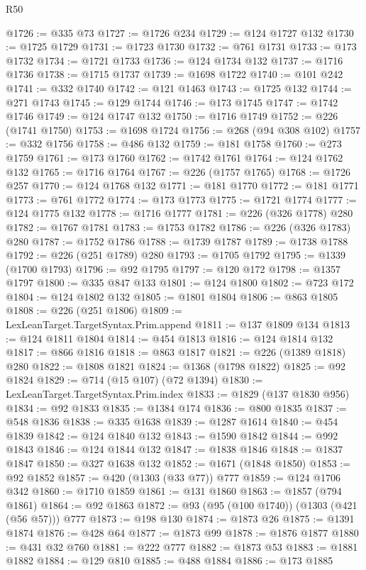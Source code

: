 \begin{lexlean}{R50}
\begin{coremodule}
@1726 := @335 @73
@1727 := @1726 @234
@1729 := @124 @1727 @132
@1730 := @1725 @1729
@1731 := @1723 @1730
@1732 := @761 @1731
@1733 := @173 @1732
@1734 := @1721 @1733
@1736 := @124 @1734 @132
@1737 := @1716 @1736
@1738 := @1715 @1737
@1739 := @1698 @1722
@1740 := @101 @242
@1741 := @332 @1740
@1742 := @121 @1463
@1743 := @1725 @132
@1744 := @271 @1743
@1745 := @129 @1744
@1746 := @173 @1745
@1747 := @1742 @1746
@1749 := @124 @1747 @132
@1750 := @1716 @1749
@1752 := @226 (@1741 @1750)
@1753 := @1698 @1724
@1756 := @268 (@94 @308 @102)
@1757 := @332 @1756
@1758 := @486 @132
@1759 := @181 @1758
@1760 := @273 @1759
@1761 := @173 @1760
@1762 := @1742 @1761
@1764 := @124 @1762 @132
@1765 := @1716 @1764
@1767 := @226 (@1757 @1765)
@1768 := @1726 @257
@1770 := @124 @1768 @132
@1771 := @181 @1770
@1772 := @181 @1771
@1773 := @761 @1772
@1774 := @173 @1773
@1775 := @1721 @1774
@1777 := @124 @1775 @132
@1778 := @1716 @1777
@1781 := @226 (@326 @1778) @280
@1782 := @1767 @1781
@1783 := @1753 @1782
@1786 := @226 (@326 @1783) @280
@1787 := @1752 @1786
@1788 := @1739 @1787
@1789 := @1738 @1788
@1792 := @226 (@251 @1789) @280
@1793 := @1705 @1792
@1795 := @1339 (@1700 @1793)
@1796 := @92 @1795
@1797 := @120 @172
@1798 := @1357 @1797
@1800 := @335 @847 @133
@1801 := @124 @1800
@1802 := @723 @172
@1804 := @124 @1802 @132
@1805 := @1801 @1804
@1806 := @863 @1805
@1808 := @226 (@251 @1806)
@1809 := LexLeanTarget.TargetSyntax.Prim.append
@1811 := @137 @1809 @134
@1813 := @124 @1811 @1804
@1814 := @454 @1813
@1816 := @124 @1814 @132
@1817 := @866 @1816
@1818 := @863 @1817
@1821 := @226 (@1389 @1818) @280
@1822 := @1808 @1821
@1824 := @1368 (@1798 @1822)
@1825 := @92 @1824
@1829 := @714 (@15 @107) (@72 @1394)
@1830 := LexLeanTarget.TargetSyntax.Prim.index
@1833 := @1829 (@137 @1830 @956)
@1834 := @92 @1833
@1835 := @1384 @174
@1836 := @800 @1835
@1837 := @548 @1836
@1838 := @335 @1638
@1839 := @1287 @1614
@1840 := @454 @1839
@1842 := @124 @1840 @132
@1843 := @1590 @1842
@1844 := @992 @1843
@1846 := @124 @1844 @132
@1847 := @1838 @1846
@1848 := @1837 @1847
@1850 := @327 @1638 @132
@1852 := @1671 (@1848 @1850)
@1853 := @92 @1852
@1857 := @420 (@1303 (@33 @77)) @777
@1859 := @124 @1706 @342
@1860 := @1710 @1859
@1861 := @131 @1860
@1863 := @1857 (@794 @1861)
@1864 := @92 @1863
@1872 := @93 (@95 (@100 @1740)) (@1303 (@421 (@56 @57))) @777
@1873 := @198 @130
@1874 := @1873 @26
@1875 := @1391 @1874
@1876 := @428 @64
@1877 := @1873 @99
@1878 := @1876 @1877
@1880 := @431 @32 @760
@1881 := @222 @777
@1882 := @1873 @53
@1883 := @1881 @1882
@1884 := @129 @810
@1885 := @488 @1884
@1886 := @173 @1885

\end{coremodule}
\end{lexlean}
